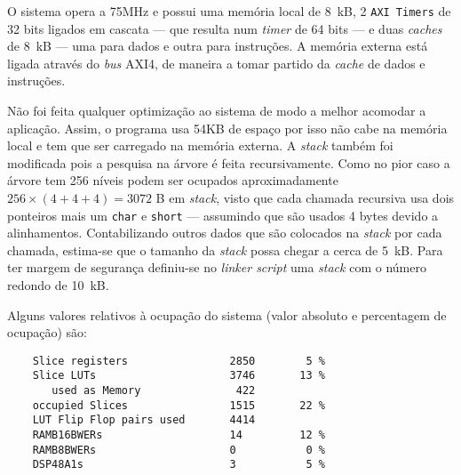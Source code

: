 O sistema opera a 75MHz e possui uma memória local de 8~kB, 2 \texttt{AXI~Timers} de 32 bits ligados em cascata --- que resulta num \textit{timer} de 64 bits --- e duas \textit{caches} de 8~kB --- uma para dados e outra para instruções. A memória externa está ligada através do \textit{bus} AXI4, de maneira a tomar partido da \textit{cache} de dados e instruções.

Não foi feita qualquer optimização ao sistema de modo a melhor acomodar a aplicação. Assim, o programa usa 54KB de espaço por isso não cabe na memória local e tem que ser carregado na memória externa. A \textit{stack} também foi modificada pois a pesquisa na árvore é feita recursivamente. Como no pior caso a árvore tem 256 níveis podem ser ocupados aproximadamente $256 \times (4 + 4 + 4) = 3072$ B em \textit{stack}, visto que cada chamada recursiva usa dois ponteiros mais um \texttt{char} e \texttt{short} --- assumindo que são usados 4 bytes devido a alinhamentos. Contabilizando outros dados que são colocados na \textit{stack} por cada chamada, estima-se que o tamanho da \textit{stack} possa chegar a cerca de 5~kB. Para ter margem de segurança definiu-se no \textit{linker script} uma \textit{stack} com o número redondo de 10~kB.

Alguns valores relativos à ocupação do sistema (valor absoluto e percentagem de ocupação) são:

\begin{verbatim}
    Slice registers                2850        5 %
    Slice LUTs                     3746       13 %
       used as Memory               422
    occupied Slices                1515       22 %
    LUT Flip Flop pairs used       4414
    RAMB16BWERs                    14         12 %
    RAMB8BWERs                     0           0 %
    DSP48A1s                       3           5 %
\end{verbatim}

